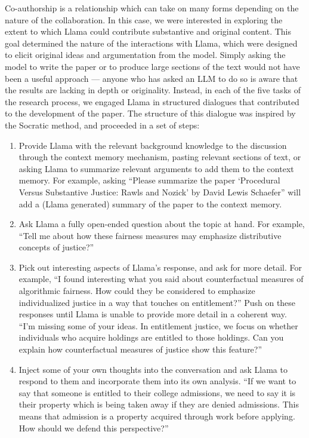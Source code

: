 Co-authorship is a relationship which can take on many forms depending on the
nature of the collaboration. In this case, we were interested in exploring the
extent to which Llama could contribute substantive and original content. This
goal determined the nature of the interactions with Llama, which were designed
to elicit original ideas and argumentation from the model. Simply asking the
model to write the paper or to produce large sections of the text would not have
been a useful approach — anyone who has asked an LLM to do so is aware that the
results are lacking in depth or originality. Instead, in each of the five tasks
of the research process, we engaged Llama in structured dialogues that
contributed to the development of the paper. The structure of this dialogue was
inspired by the Socratic method, and proceeded in a set of steps:
\begin{enumerate}
    \item Provide Llama with the relevant background knowledge to the discussion
          through the context memory mechanism, pasting relevant sections of
          text, or asking Llama to summarize relevant arguments to add them to
          the context memory. For example, asking ``Please summarize the paper
          `Procedural Versus Substantive Justice: Rawls and Nozick' by David
          Lewis Schaefer'' will add a (Llama generated) summary of the paper to
          the context memory.
    \item Ask Llama a fully open-ended question about the topic at hand. For
          example, ``Tell me about how these fairness measures may emphasize
          distributive concepts of justice?''
    \item Pick out interesting aspects of Llama's response, and ask for more
          detail. For example, ``I found interesting what you said about
          counterfactual measures of algorithmic fairness. How could they be
          considered to emphasize individualized justice in a way that touches
          on entitlement?'' Push on these responses until Llama is unable to
          provide more detail in a coherent way. ``I'm missing some of your
          ideas. In entitlement justice, we focus on whether individuals who
          acquire holdings are entitled to those holdings. Can you explain how
          counterfactual measures of justice show this feature?''
    \item Inject some of your own thoughts into the conversation and ask Llama 
          to respond to them and incorporate them into its own analysis. ``If we
          want to say that someone is entitled to their college admissions, we
          need to say it is their property which is being taken away if they are
          denied admissions. This means that admission is a property acquired
          through work before applying. How should we defend this perspective?''
\end{enumerate}

